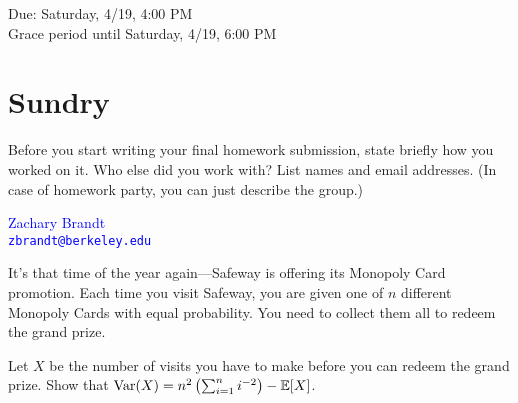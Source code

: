 \documentclass[11pt]{article}
\begin{document}
\maketitle
\fontsize{12}{15}\selectfont

\begin{center}
    Due: Saturday, 4/19, 4:00 PM \\
    Grace period until Saturday, 4/19, 6:00 PM \\
\end{center}

\section*{Sundry}
Before you start writing your final homework submission, state briefly how you 
worked on it. Who else did you work with?  List names and email addresses. (In 
case of homework party, you can just describe the group.)

\begin{center}
    \textcolor{blue}{
        Zachary Brandt \\
        \nolinkurl{zbrandt@berkeley.edu}
    }
\end{center}

\vspace{15pt}


It's that time of the year again---Safeway is offering its Monopoly Card 
promotion. Each time you visit Safeway, you are given one of $n$ different 
Monopoly Cards with equal probability. You need to collect them all to redeem 
the grand prize.

Let $X$ be the number of visits you have to make before you can redeem the grand 
prize. Show that $\operatorname{Var}(X) = n^2\left(\sum_{i=1}^n i^{-2}\right) - \operatorname{\mathbb{E}}[X]$.
\end{document}

